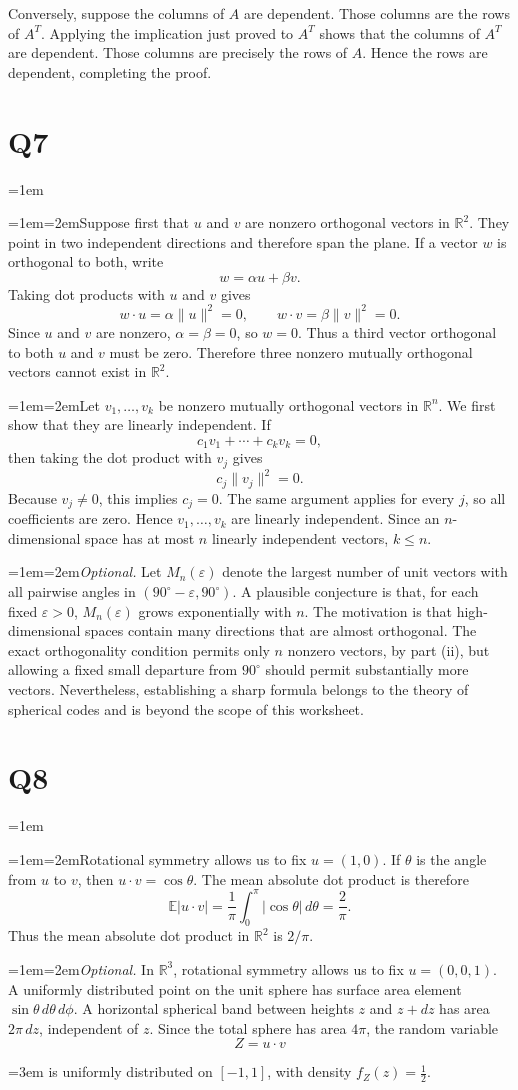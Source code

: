 \documentclass[11pt]{article}
\newcommand{\solutionquestion}[1]{\par\leftskip=0pt\section*{Q#1}\leftskip=1em}
\newcommand{\solutionpart}[1]{\par\smallskip\leftskip=1em\noindent\hangindent=2em\hangafter=1\makebox[1.5em][l]{\textbf{(#1)}}\hspace{0.5em}\ignorespaces}
\newcommand{\solutioncontinuation}{\par\leftskip=3em\noindent\ignorespaces}
\begin{document}
Conversely, suppose the columns of $A$ are dependent. Those columns are the rows of $A^{T}$. Applying the implication just proved to $A^{T}$ shows that the columns of $A^{T}$ are dependent. Those columns are precisely the rows of $A$. Hence the rows are dependent, completing the proof.

\solutionquestion{7}
\solutionpart{i}Suppose first that $u$ and $v$ are nonzero orthogonal vectors in $\mathbb R^2$. They point in two independent directions and therefore span the plane. If a vector $w$ is orthogonal to both, write
\[
w=\alpha u+\beta v.
\]
Taking dot products with $u$ and $v$ gives
\[
w\cdot u=\alpha\|u\|^2=0,
\qquad
w\cdot v=\beta\|v\|^2=0.
\]
Since $u$ and $v$ are nonzero, $\alpha=\beta=0$, so $w=0$. Thus a third vector orthogonal to both $u$ and $v$ must be zero. Therefore three nonzero mutually orthogonal vectors cannot exist in $\mathbb R^2$.

\solutionpart{ii}Let $v_1,\ldots,v_k$ be nonzero mutually orthogonal vectors in $\mathbb R^n$. We first show that they are linearly independent. If
\[
c_1v_1+\cdots+c_k v_k=0,
\]
then taking the dot product with $v_j$ gives
\[
c_j\|v_j\|^2=0.
\]
Because $v_j\ne0$, this implies $c_j=0$. The same argument applies for every $j$, so all coefficients are zero. Hence $v_1,\ldots,v_k$ are linearly independent. Since an $n$-dimensional space has at most $n$ linearly independent vectors, $k\leq n$.

\solutionpart{iii}\textit{Optional.} Let $M_n(\varepsilon)$ denote the largest number of unit vectors with all pairwise angles in $(90^\circ-\varepsilon,90^\circ)$. A plausible conjecture is that, for each fixed $\varepsilon>0$, $M_n(\varepsilon)$ grows exponentially with $n$. The motivation is that high-dimensional spaces contain many directions that are almost orthogonal. The exact orthogonality condition permits only $n$ nonzero vectors, by part (ii), but allowing a fixed small departure from $90^\circ$ should permit substantially more vectors. Nevertheless, establishing a sharp formula belongs to the theory of spherical codes and is beyond the scope of this worksheet.

\solutionquestion{8}
\solutionpart{i}Rotational symmetry allows us to fix $u=(1,0)$. If $\theta$ is the angle from $u$ to $v$, then $u\cdot v=\cos\theta$. The mean absolute dot product is therefore
\[
\mathbb E|u\cdot v|
=\frac1\pi\int_0^\pi|\cos\theta|\,d\theta
=\frac2\pi.
\]
Thus the mean absolute dot product in $\mathbb R^2$ is $\boxed{2/\pi}$.

\solutionpart{ii}\textit{Optional.} In $\mathbb R^3$, rotational symmetry allows us to fix $u=(0,0,1)$. A uniformly distributed point on the unit sphere has surface area element $\sin\theta\,d\theta\,d\phi$. A horizontal spherical band between heights $z$ and $z+dz$ has area $2\pi\,dz$, independent of $z$. Since the total sphere has area $4\pi$, the random variable
\[
Z=u\cdot v
\]
\solutioncontinuation{} is uniformly distributed on $[-1,1]$, with density $f_Z(z)=\tfrac12$.
\end{document}
